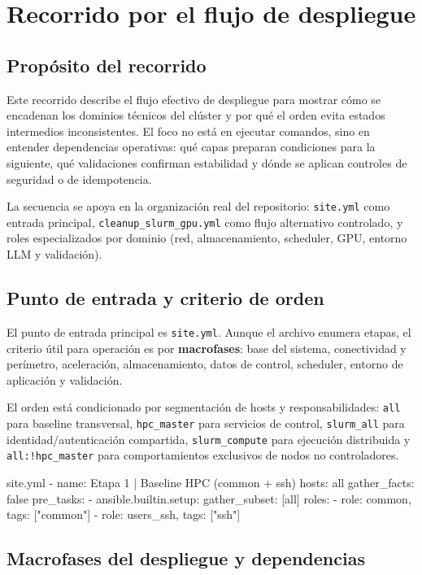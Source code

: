 \section{Recorrido por el flujo de despliegue}
\label{sec:flujo_despliegue}

\subsection{Propósito del recorrido}
Este recorrido describe el flujo efectivo de despliegue para mostrar cómo se encadenan los dominios técnicos del clúster y por qué el orden evita estados intermedios inconsistentes. El foco no está en ejecutar comandos, sino en entender dependencias operativas: qué capas preparan condiciones para la siguiente, qué validaciones confirman estabilidad y dónde se aplican controles de seguridad o de idempotencia.

La secuencia se apoya en la organización real del repositorio: \texttt{site.yml} como entrada principal, \texttt{cleanup\_slurm\_gpu.yml} como flujo alternativo controlado, y roles especializados por dominio (red, almacenamiento, scheduler, GPU, entorno LLM y validación).

\subsection{Punto de entrada y criterio de orden}
El punto de entrada principal es \texttt{site.yml}. Aunque el archivo enumera etapas, el criterio útil para operación es por \textbf{macrofases}: base del sistema, conectividad y perímetro, aceleración, almacenamiento, datos de control, scheduler, entorno de aplicación y validación.

El orden está condicionado por segmentación de hosts y responsabilidades: \texttt{all} para baseline transversal, \texttt{hpc\_master} para servicios de control, \texttt{slurm\_all} para identidad/autenticación compartida, \texttt{slurm\_compute} para ejecución distribuida y \texttt{all:!hpc\_master} para comportamientos exclusivos de nodos no controladores.

\begin{filecode}{site.yml}
- name: Etapa 1 | Baseline HPC (common + ssh)
  hosts: all
  gather_facts: false
  pre_tasks:
    - ansible.builtin.setup:
        gather_subset: [all]
  roles:
    - { role: common, tags: ["common"] }
    - { role: users_ssh, tags: ["ssh"] }
\end{filecode}

\subsection{Macrofases del despliegue y dependencias}

